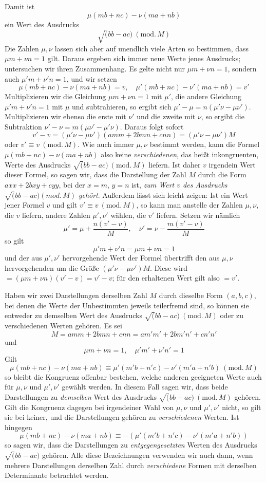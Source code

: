 Damit ist
\[
\mu(mb+nc)-\nu(ma+nb)
\]
ein Wert des Ausdrucks
\[
\surd(bb-ac)\ (\mathrm{mod.}\,M)
\]
Die Zahlen $\mu,\nu$ lassen sich aber auf unendlich viele Arten so bestimmen, dass $\mu m+\nu n=1$ gilt. Daraus ergeben sich immer neue Werte jenes Ausdrucks; untersuchen wir ihren Zusammenhang. Es gelte nicht nur $\mu m+\nu n=1$, sondern auch $\mu'm+\nu'n=1$, und wir setzen
\[
\mu(mb+nc)-\nu(ma+nb)=v,\quad
\mu'(mb+nc)-\nu'(ma+nb)=v'
\]
Multiplizieren wir die Gleichung $\mu m+\nu n=1$ mit $\mu'$, die andere Gleichung $\mu'm+\nu'n=1$ mit $\mu$ und subtrahieren, so ergibt sich $\mu'-\mu=n(\mu'\nu-\mu\nu')$. Multiplizieren wir ebenso die erste mit $\nu'$ und die zweite mit $\nu$, so ergibt die Subtraktion $\nu'-\nu=m(\mu\nu'-\mu'\nu)$. Daraus folgt sofort
\[
v'-v=(\mu'\nu-\mu\nu')(amm+2bmn+cnn)=(\mu'\nu-\mu\nu')M
\]
oder $v'\equiv v\ (\mathrm{mod.}\,M)$. Wie auch immer $\mu,\nu$ bestimmt werden, kann die Formel $\mu(mb+nc)-\nu(ma+nb)$ also keine \textit{verschiedenen}, das heißt inkongruenten, Werte des Ausdrucks $\surd(bb-ac)\ (\mathrm{mod.}\,M)$ liefern. Ist daher $v$ irgendein Wert dieser Formel, so sagen wir, dass die Darstellung der Zahl $M$ durch die Form $axx+2bxy+cyy$, bei der $x=m$, $y=n$ ist, \textit{zum Wert $v$ des Ausdrucks $\surd(bb-ac)(\mathit{mod.}\,M)$ gehört}. Außerdem lässt sich leicht zeigen: Ist ein Wert jener Formel $v$ und gilt $v'\equiv v\ (\mathrm{mod.}\,M)$, so kann man anstelle der Zahlen $\mu,\nu$, die $v$ liefern, andere Zahlen $\mu',\nu'$ wählen, die $v'$ liefern. Setzen wir nämlich
\[
\mu'=\mu+\frac{n(v'-v)}{M},\quad
\nu'=\nu-\frac{m(v'-v)}{M}
\]
so gilt
\[
\mu'm+\nu'n=\mu m+\nu n=1
\]
und der aus $\mu',\nu'$ hervorgehende Wert der Formel übertrifft den aus $\mu,\nu$ hervorgehenden um die Größe $(\mu'\nu-\mu\nu')M$. Diese wird $=(\mu m+\nu n)(v'-v)=v'-v$; für den erhaltenen Wert gilt also $=v'$.

Haben wir zwei Darstellungen derselben Zahl $M$ durch dieselbe Form $(a,b,c)$, bei denen die Werte der Unbestimmten jeweils teilerfremd sind, so können sie entweder zu demselben Wert des Ausdrucks $\surd(bb-ac)\ (\mathrm{mod.}\,M)$ oder zu verschiedenen Werten gehören. Es sei
\[
M=amm+2bmn+cnn=am'm'+2bm'n'+cn'n'
\]
und
\[
\mu m+\nu n=1,\quad \mu'm'+\nu'n'=1
\]
Gilt
\[
\mu(mb+nc)-\nu(ma+nb)\equiv\mu'(m'b+n'c)-\nu'(m'a+n'b)\ (\mathrm{mod.}\,M)
\]
so bleibt die Kongruenz offenbar bestehen, welche anderen geeigneten Werte auch für $\mu,\nu$ und $\mu',\nu'$ gewählt werden. In diesem Fall sagen wir, dass beide Darstellungen zu \textit{demselben} Wert des Ausdrucks $\surd(bb-ac)\ (\mathrm{mod.}\,M)$ gehören. Gilt die Kongruenz dagegen bei irgendeiner Wahl von $\mu,\nu$ und $\mu',\nu'$ nicht, so gilt sie bei keiner, und die Darstellungen gehören zu \textit{verschiedenen} Werten. Ist hingegen
\[
\mu(mb+nc)-\nu(ma+nb)\equiv-(\mu'(m'b+n'c)-\nu'(m'a+n'b))
\]
so sagen wir, dass die Darstellungen zu \textit{entgegengesetzten} Werten des Ausdrucks $\surd(bb-ac)$ gehören. Alle diese Bezeichnungen verwenden wir auch dann, wenn mehrere Darstellungen derselben Zahl durch \textit{verschiedene} Formen mit derselben Determinante betrachtet werden.

